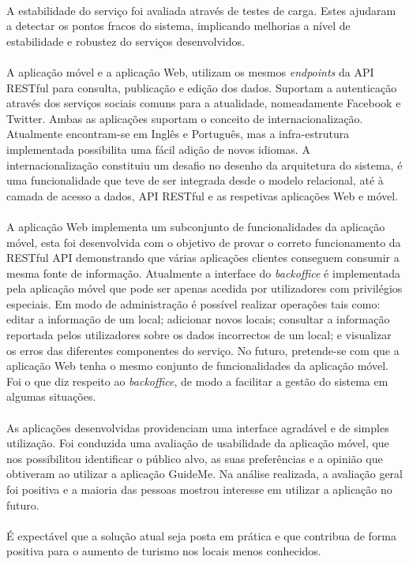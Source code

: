 \\
A estabilidade do serviço foi avaliada através de testes de carga. Estes ajudaram a detectar os pontos fracos do sistema, implicando melhorias a nível de estabilidade e robustez do serviços desenvolvidos.\\
\\
A aplicação móvel e a aplicação Web, utilizam os mesmos \textit{endpoints} da API RESTful para consulta, publicação e edição dos dados. Suportam a autenticação através dos serviços sociais comuns para a atualidade, nomeadamente Facebook e Twitter. Ambas as aplicações suportam o conceito de internacionalização. Atualmente encontram-se em Inglês e Português, mas a infra-estrutura implementada possibilita uma fácil adição de novos idiomas. A internacionalização constituiu um desafio no desenho da arquitetura do sistema, é uma funcionalidade que teve de ser integrada desde o modelo relacional, até à camada de acesso a dados, API RESTful e as respetivas aplicações Web e móvel.\\
\\
A aplicação Web implementa um subconjunto de funcionalidades da aplicação móvel, esta foi desenvolvida com o objetivo de provar o correto funcionamento da RESTful API demonstrando que várias aplicações clientes conseguem consumir a mesma fonte de informação. Atualmente a interface do \textit{backoffice} é implementada pela aplicação móvel que pode ser apenas acedida por utilizadores com privilégios especiais. Em modo de administração é possível realizar operações tais como: editar a informação de um local; adicionar novos locais; consultar a informação reportada pelos utilizadores sobre os dados incorrectos de um local; e visualizar os erros das diferentes componentes do serviço. No futuro, pretende-se com que a aplicação Web tenha o mesmo conjunto de funcionalidades da aplicação móvel. Foi o que diz respeito ao \textit{backoffice}, de modo a facilitar a gestão do sistema em algumas situações.\\
\\
As aplicações desenvolvidas providenciam uma interface agradável e de simples utilização. Foi conduzida uma avaliação de usabilidade da aplicação móvel, que nos possibilitou identificar o público alvo, as suas preferências e a opinião que obtiveram ao utilizar a aplicação GuideMe. Na análise realizada, a avaliação geral foi positiva e a maioria das pessoas mostrou interesse em utilizar a aplicação no futuro.\\
\\
É expectável que a solução atual seja posta em prática e que contribua de forma positiva para o aumento de turismo nos locais menos conhecidos.
\fi
